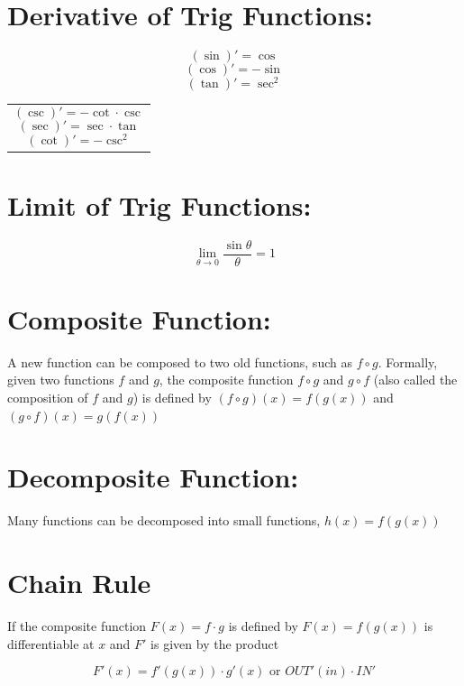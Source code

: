 \documentclass[12pt]{article}
\begin{document}
\section{Derivative of Trig Functions:}
\begin{minipage}{0.5\textwidth}
    
    $$(\sin)' = \cos$$
    $$(\cos)' = -\sin$$
    $$(\tan)' = \sec^2 $$
\hfil
\end{minipage}
\begin{minipage}{0.45\textwidth}
\begin{tabular}{|p{\textwidth}}

    $$(\csc)' = -\cot \cdot \csc$$
    $$(\sec)' = \sec \cdot \tan$$
    $$(\cot)' = -\csc^2 $$

\end{tabular}
\end{minipage}

\section{Limit of Trig Functions:}

$$\lim_{\theta \to 0}{\frac{\sin \theta}{\theta}} = 1$$

\section{Composite Function: } A new function can be  composed to two old functions, such as $f \circ g$. Formally, given two functions $f$ and $g$, the composite function $f \circ g$ and $g \circ f$ (also called the composition of $f$ and $g$) is defined by $(f \circ g)(x)  = f(g(x))$ and $(g \circ f)(x)  = g(f(x))$

\section{Decomposite Function: } Many functions can be decomposed into small functions, $h(x) = f(g(x))$

\section{Chain Rule} If the composite function $F(x) = f \cdot g$ is defined by $F(x) = f(g(x))$ is differentiable at $x$ and $F'$ is given by the product 

$$F'(x) = f'(g(x)) \cdot g'(x) \text{ or } OUT'(in) \cdot IN'$$

\noindent{}
\end{document}
